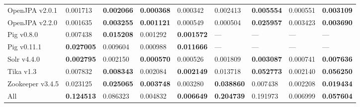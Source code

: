 \begin{table*}[ht]
\begin{tabular}{l|ll|ll||ll|ll}
OpenJPA v2.0.1 & 0.001713 & {\bf 0.002066 } & {\bf 0.000368 } & 0.000342 & 0.002413 & {\bf 0.005554 } & 0.000551 & {\bf 0.003109 } \\
OpenJPA v2.2.0 & 0.001635 & {\bf 0.003255 } & {\bf 0.001121 } & 0.000549 & 0.000504 & {\bf 0.025957 } & 0.003423 & {\bf 0.003690 } \\
Pig v0.8.0 & 0.007438 & {\bf 0.015208 } & 0.001292 & {\bf 0.001572 } & --- & --- & --- & --- \\
Pig v0.11.1 & {\bf 0.027005 } & 0.009604 & 0.000988 & {\bf 0.011666 } & --- & --- & --- & --- \\
Solr v4.4.0 & {\bf 0.002795 } & 0.002150 & {\bf 0.000570 } & 0.000526 & 0.001809 & {\bf 0.003087 } & 0.000741 & {\bf 0.007636 } \\
Tika v1.3 & 0.007832 & {\bf 0.008343 } & 0.002084 & {\bf 0.002149 } & 0.013718 & {\bf 0.052773 } & 0.002140 & {\bf 0.056250 } \\
Zookeeper v3.4.5 & 0.023125 & {\bf 0.025065 } & {\bf 0.003748 } & 0.003280 & {\bf 0.038860 } & 0.007438 & 0.002208 & {\bf 0.019434 } \\
    \midrule
All & {\bf 0.124513 } & 0.086323 & 0.004832 & {\bf 0.006649 } & {\bf 0.204739 } & 0.191973 & 0.006999 & {\bf 0.057604 } \\
    \bottomrule
\end{tabular}
\label{table:mrr:classes}
\end{table*}


